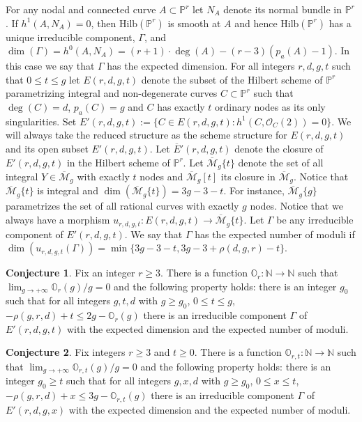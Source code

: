 \documentclass{amsart}
\theoremstyle{plain}
\theoremstyle{definition}
\newtheorem{conjecture}{Conjecture}
\begin{document}
For any nodal and connected curve $A\subset \mathbb {P}^r$ let $N_A$ denote its normal bundle in $\mathbb {P}^r$. If $h^1(A,N_A)=0$, then $\mbox{Hilb}(\mathbb {P}^r)$ is smooth
at $A$ and hence $\mbox{Hilb}(\mathbb {P}^r)$ has a unique irreducible component, $\Gamma$, and $\dim (\Gamma ) =h^0(A,N_A) = (r+1)\cdot \deg (A)-(r-3)(p_a(A)-1)$. In this case we say that
$\Gamma$ has the expected dimension. For all integers $r, d, g, t$ such that $0 \le t \le g$ let $E(r,d,g,t)$ denote the subset of the Hilbert scheme of $\mathbb {P}^r$ parametrizing integral
and non-degenerate curves $C\subset \mathbb {P}^r$ such that $\deg (C)=d$, $p_a(C) =g$ and $C$ has exactly $t$ ordinary nodes
as its only singularities. Set $E'(r,d,g,t):= \{C\in E(r,d,g,t): h^1(C,\mathcal {O}_C(2))=0\}$. We will always take the reduced structure as the scheme structure
for $E(r,d,g,t)$ and its open subset $E'(r,d,g,t)$. Let $\overline{E}'(r,d,g,t)$ denote the closure of $E'(r,d,g,t)$ in the Hilbert scheme of $\mathbb {P}^r$. Let $\overline{\mathcal {M}}_g\{t\}$ denote the set of all integral $Y\in \overline{\mathcal {M}}_g$
with exactly $t$ nodes and $\overline{\mathcal {M}}_g[t]$ its closure in $\overline{\mathcal {M}}_g$. Notice
that $\overline{\mathcal {M}}_g\{t\}$ is integral and $\dim( \overline{\mathcal {M}}_g\{t\} ) =3g-3-t$. For instance, $\overline{\mathcal {M}}_g\{g\}$ parametrizes the set of all rational curves with exactly $g$ nodes.
Notice that we always have a morphism $u_{r,d,g,t}: E(r,d,g,t) \to \overline{\mathcal {M}}_g\{t\}$. Let $\Gamma$ be any irreducible component of $E'(r,d,g,t)$. We say
that $\Gamma$ has the expected number of moduli if $\dim (u_{r,d,g,t}(\Gamma )) = \min \{3g-3-t,3g-3 +\rho (d,g,r)-t\}$.

\begin{conjecture}\label{i1}
Fix an integer $r \ge 3$. There is a function $\mathbb {O}_r: \mathbb {N} \to \mathbb {N}$ such that $\lim _{g\to +\infty} \mathbb {O}_r(g)/g = 0$ and the following property holds:
there is an integer $g_0$ such that for all integers $g, t, d$ with $g\ge g_0$, $0 \le t \le g$, $-\rho (g,r,d) +t \le 2g -\mathbb {O}_r(g)$ there is an irreducible
component $\Gamma$ of $E'(r,d,g,t)$ with the expected dimension and the expected number of moduli.
\end{conjecture}

\begin{conjecture}\label{i2}
Fix integers $r\ge 3$ and $t\ge 0$. There is a function $\mathbb {O}_{r,t}: \mathbb {N} \to \mathbb {N}$ such that $\lim _{g\to +\infty} \mathbb {O}_{r,t}(g)/g = 0$ and the following property holds:
there is an integer $g_0 \ge t$ such that for all integers $g, x, d$ with $g\ge g_0$, $0\le x \le t$, $-\rho (g,r,d) +x \le 3g -\mathbb {O}_{r,t}(g)$ there is an irreducible
component $\Gamma$ of $E'(r,d,g,x)$ with the expected dimension and the expected number of moduli.
\end{conjecture}
\end{document}
